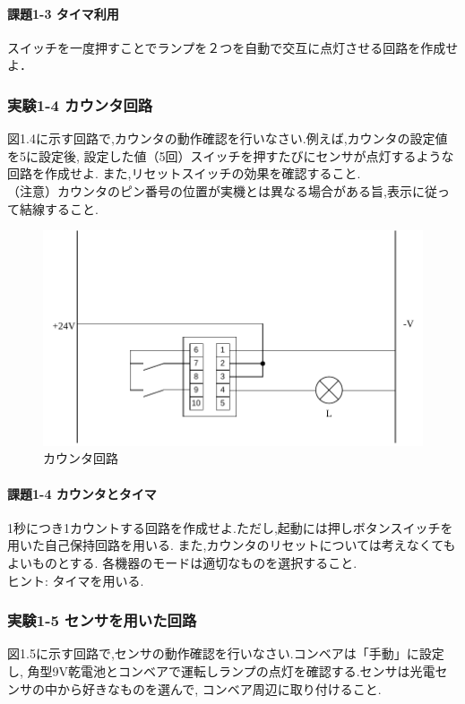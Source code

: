 \paragraph{課題1-3 タイマ利用}
スイッチを一度押すことでランプを２つを自動で交互に点灯させる回路を作成せよ．

\subsubsection{実験1-4 カウンタ回路}
図1.4に示す回路で,カウンタの動作確認を行いなさい.例えば,カウンタの設定値を5に設定後,
設定した値（5回）スイッチを押すたびにセンサが点灯するような回路を作成せよ.
また,リセットスイッチの効果を確認すること.\\
（注意）カウンタのピン番号の位置が実機とは異なる場合がある旨,表示に従って結線すること.

\begin{figure}[H]
  \centering
  \includegraphics[scale=0.5]{sozai/3.pdf}
  \caption{カウンタ回路}
\end{figure}

\paragraph{課題1-4 カウンタとタイマ}
1秒につき1カウントする回路を作成せよ.ただし,起動には押しボタンスイッチを用いた自己保持回路を用いる.
また,カウンタのリセットについては考えなくてもよいものとする.
各機器のモードは適切なものを選択すること.\\
ヒント: タイマを用いる.

\subsubsection{実験1-5 センサを用いた回路}
図1.5に示す回路で,センサの動作確認を行いなさい.コンベアは「手動」に設定し,
角型9V乾電池とコンベアで運転しランプの点灯を確認する.センサは光電センサの中から好きなものを選んで,
コンベア周辺に取り付けること.

